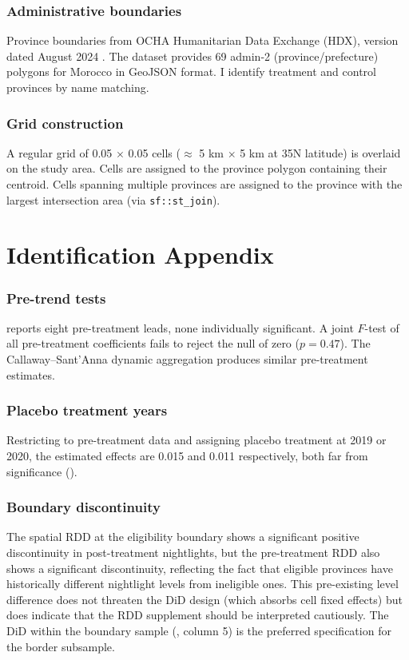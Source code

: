 \documentclass[12pt]{article}
\begin{document}
\subsubsection*{Administrative boundaries} Province boundaries from OCHA Humanitarian Data Exchange (HDX), version dated August 2024 \citep{HDX2024}. The dataset provides 69 admin-2 (province/prefecture) polygons for Morocco in GeoJSON format. I identify treatment and control provinces by name matching.

\subsubsection*{Grid construction} A regular grid of 0.05\textdegree{} $\times$ 0.05\textdegree{} cells ($\approx$ 5 km $\times$ 5 km at 35\textdegree N latitude) is overlaid on the study area. Cells are assigned to the province polygon containing their centroid. Cells spanning multiple provinces are assigned to the province with the largest intersection area (via \texttt{sf::st\_join}).

\section{Identification Appendix}

\subsubsection*{Pre-trend tests}  reports eight pre-treatment leads, none individually significant. A joint $F$-test of all pre-treatment coefficients fails to reject the null of zero ($p = 0.47$). The Callaway--Sant'Anna dynamic aggregation produces similar pre-treatment estimates.

\subsubsection*{Placebo treatment years} Restricting to pre-treatment data and assigning placebo treatment at 2019 or 2020, the estimated effects are 0.015 and 0.011 respectively, both far from significance ().

\subsubsection*{Boundary discontinuity} The spatial RDD at the eligibility boundary shows a significant positive discontinuity in post-treatment nightlights, but the pre-treatment RDD also shows a significant discontinuity, reflecting the fact that eligible provinces have historically different nightlight levels from ineligible ones. This pre-existing level difference does not threaten the DiD design (which absorbs cell fixed effects) but does indicate that the RDD supplement should be interpreted cautiously. The DiD within the boundary sample (, column 5) is the preferred specification for the border subsample.
\end{document}
